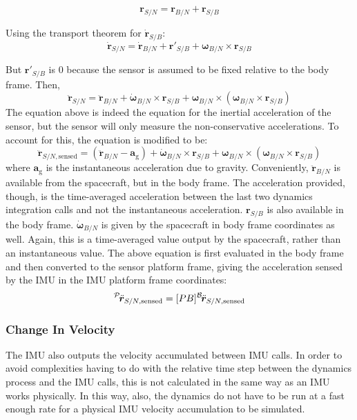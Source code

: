 \begin{equation}
\bm{r}_{S/N} = \bm{r}_{B/N} + \bm{r}_{S/B}
\end{equation}

Using the transport theorem for $\dot{\bm{r}}_{S/B}$:
\begin{equation}
	\dot{\bm{r}}_{S/N} = \dot{\bm{r}}_{B/N} + \bm{r}'_{S/B} + \bm{\omega}_{B/N} \times \bm{r}_{S/B}
	\label{eq:rDot}
\end{equation}

But $\bm{r}'_{S/B}$ is $0$ because the sensor is assumed to be fixed relative to the body frame. Then,
\begin{equation}
\ddot{\bm{r}}_{S/N} = \ddot{\bm{r}}_{B/N} + \dot{\bm{\omega}}_{B/N} \times \bm{r}_{S/B} +  \bm{\omega}_{B/N} \times (\bm{\omega}_{B/N} \times \bm{r}_{S/B})
\end{equation}
The equation above is indeed the equation for the inertial acceleration of the sensor, but the sensor will only measure the non-conservative accelerations. To account for this, the equation is modified to be:
\begin{equation}
\ddot{\bm{r}}_{S/N, \textrm{sensed}} = (\ddot{\bm{r}}_{B/N} - \bm{a}_\textrm{g}) + \dot{\bm{\omega}}_{B/N} \times \bm{r}_{S/B} +  \bm{\omega}_{B/N} \times (\bm{\omega}_{B/N} \times \bm{r}_{S/B})
\end{equation}
where $\bm{a}_\textrm{g}$ is the instantaneous acceleration due to gravity. Conveniently, $\ddot{\bm{r}}_{B/N}$ is available from the spacecraft, but in the body frame. The acceleration provided, though, is the time-averaged acceleration between the last two dynamics integration calls and not the instantaneous acceleration. $\bm{r}_{S/B}$ is also available in the body frame. $\dot{\bm{\omega}}_{B/N}$ is given by the spacecraft in body frame coordinates as well. Again, this is a time-averaged value output by the spacecraft, rather than an instantaneous value. The above equation is first evaluated in the body frame and then converted to the sensor platform frame, giving the acceleration sensed by the IMU in the IMU platform frame coordinates:
\begin{equation}
	\leftexp{P}{\ddot{\bm{r}}_{S/N, \textrm{sensed}}} = [PB] \leftexp{B}{ \ddot{\bm{r}}_{S/N, \textrm{sensed}}}
\end{equation}

\subsubsection{Change In Velocity}
The IMU also outputs the velocity accumulated between IMU calls. In order to avoid complexities having to do with the relative time step between the dynamics process and the IMU calls, this is not calculated in the same way as an IMU works physically. In this way, also, the dynamics do not have to be run at a fast enough rate for a physical IMU velocity accumulation to be simulated.

